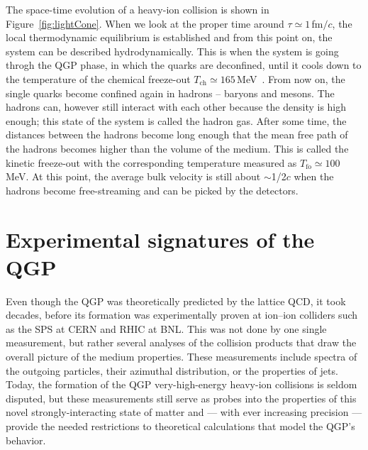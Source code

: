 The space-time evolution of a heavy-ion collision is shown in Figure~\ref{fig:lightCone}. When we look at the proper time around $\tau \simeq 1\,$fm$/c$, the local thermodynamic equilibrium is established and from this point on, the system can be described hydrodynamically. This is when the system is going throgh the QGP phase, in which the quarks are deconfined, until it cools down to the temperature of the chemical freeze-out $T_\mathrm{ch} \simeq 165\,$MeV~\cite{ALICE_lightFlavor,STAR_LightFlavor}\@. From now on, the single quarks become confined again in hadrons -- baryons and mesons. The hadrons can, however still interact with each other because the density is high enough; this state of the system is called the hadron gas. After some time, the distances between the hadrons become long enough that the mean free path of the hadrons becomes higher than the volume of the medium. This is called the kinetic freeze-out with the corresponding temperature measured as $T_\mathrm{fo} \simeq 100\,$MeV. At this point, the average bulk velocity is still about $\sim$1/2$c$ when the hadrons become free-streaming and can be picked by the detectors.





\section{Experimental signatures of the QGP}
Even though the QGP was theoretically predicted by the lattice QCD, it took decades, before its formation was experimentally proven at ion--ion colliders such as the SPS at CERN and RHIC at BNL\@.  
This was not done by one single measurement, but rather several analyses of the collision products that draw the overall picture of the medium properties. These measurements include spectra of the outgoing particles, their azimuthal distribution, or the properties of jets. Today, the formation of the QGP very-high-energy heavy-ion collisions is seldom disputed, but these measurements still serve as probes into the properties of this novel strongly-interacting state of matter and --- with ever increasing precision --- provide the needed restrictions to theoretical calculations that model the QGP's behavior.

